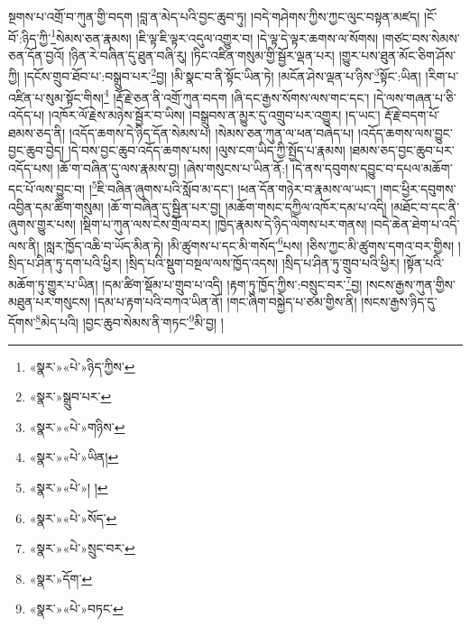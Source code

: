 སྔགས་པ་འགྲོ་བ་ཀུན་གྱི་བདག །བླ་ན་མེད་པའི་བྱང་ཆུབ་ཏུ། །བདེ་གཤེགས་ཀྱིས་ཀྱང་ལུང་བསྟན་མཛད། །ངོ་བོ་:ཉིད་ཀྱི་\footnote{«སྣར་»«པེ་»ཉིད་ཀྱིས་}སེམས་ཅན་རྣམས། །ཇི་ལྟ་ཇི་ལྟར་འདུལ་འགྱུར་བ། །དེ་ལྟ་དེ་ལྟར་ཆགས་ལ་སོགས། །གཙང་བས་སེམས་ཅན་དོན་བྱའོ། །ཉིན་རེ་བཞིན་དུ་ཐུན་བཞི་རུ། །ཏིང་འཛིན་གསུམ་གྱི་སྦྱོར་ལྡན་པར། །གྱུར་པས་ཐུན་མོང་ཅིག་ཤོས་ཀྱི། །དངོས་གྲུབ་ཐོབ་པ་:བསྒྲུབ་པར་\footnote{«སྣར་»སྒྲུབ་པར་}བྱ། །མི་སྣང་བ་ནི་སྟོང་ཡིན་ཏེ། །མངོན་ཤེས་ལྡན་པ་ཉིས་\footnote{«སྣར་»«པེ་»གཉིས་}སྟོང་:ཡིན། །རིག་པ་འཛིན་པ་སུམ་སྟོང་གིས།\footnote{«སྣར་»«པེ་»ཡིན།} །རྡོ་རྗེ་ཅན་ནི་འགྲོ་ཀུན་བདག །ཞི་དང་རྒྱས་སོགས་ལས་གང་དང་། །དེ་ལས་གཞན་པ་ཅི་འདོད་པ། །འཁོར་ལོ་རྗེས་མཉེས་སྦྱོར་བ་ཡིས། །བསྒྲུབས་ན་མྱུར་དུ་འགྲུབ་པར་འགྱུར། །ད་ཡང་། རྡོ་རྗེ་བདག་པོ་ཐམས་ཅད་ནི། །འདོད་ཆགས་དེ་ཉིད་དོན་སེམས་པ། །སེམས་ཅན་ཀུན་ལ་ཕན་བཞེད་པ། །འདོད་ཆགས་ལས་བྱུང་བྱང་ཆུབ་བྱེད། །དེ་བས་བྱང་ཆུབ་འདོད་ཆགས་པས། །ལུས་ངག་ཡིད་ཀྱི་སྤྱོད་པ་རྣམས། །ཐམས་ཅད་བྱང་ཆུབ་པར་འདོད་པས། །ཆོ་ག་བཞིན་དུ་ལས་རྣམས་བྱ། །ཞེས་གསུངས་པ་ཡིན་ནོ:། །དེ་ནས་དབུགས་དབྱུང་བ་དཔལ་མཆོག་དང་པོ་ལས་བྱུང་བ། །\footnote{«སྣར་»«པེ་»། །}ཇི་བཞིན་ཞུགས་པའི་སློབ་མ་དང་། །ཕན་དོན་གཉེར་བ་རྣམས་ལ་ཡང་། །གང་ཕྱིར་དབུགས་འབྱིན་དམ་ཚིག་གསུམ། །ཆོ་ག་བཞིན་དུ་སྦྱིན་པར་བྱ། །མཆོག་གསང་དཀྱིལ་འཁོར་དམ་པ་འདི། །མཐོང་བ་དང་ནི་ཞུགས་གྱུར་པས། །སྡིག་པ་ཀུན་ལས་ངེས་གྲོལ་བར། །ཁྱེད་རྣམས་དེ་ཉིད་ལེགས་པར་གནས། །བདེ་ཆེན་ཐེག་པ་འདི་ལས་ནི། །སླར་ཁྱོད་འཆི་བ་ཡོད་མིན་ཏེ། །མི་ཚུགས་པ་དང་མི་གསོད་\footnote{«སྣར་»«པེ་»སོད་}པས། །ཅིས་ཀྱང་མི་ཚུགས་དགའ་བར་གྱིས། །སྲིད་པ་ཤིན་ཏུ་དག་པའི་ཕྱིར། །སྲིད་པའི་སྡུག་བསྔལ་ལས་ཁྱོད་འདས། །སྲིད་པ་ཤིན་ཏུ་གྲུབ་པའི་ཕྱིར། །སྟོན་པའི་མཆོག་ཏུ་གྱུར་པ་ཡིན། །དམ་ཚིག་སྡོམ་པ་གྲུབ་པ་འདི། །རྟག་ཏུ་ཁྱོད་ཀྱིས་:བསྲུང་བར་\footnote{«སྣར་»«པེ་»སྲུང་བར་}བྱ། །སངས་རྒྱས་ཀུན་གྱིས་མཐུན་པར་གསུངས། །དམ་པ་རྟག་པའི་བཀའ་ཡིན་ནོ། །གང་ཞིག་བསྐྱེད་པ་ཙམ་གྱིས་ནི། །སངས་རྒྱས་ཉིད་དུ་དོགས་\footnote{«སྣར་»དོག་}མེད་པའི། །བྱང་ཆུབ་སེམས་ནི་གཏང་\footnote{«སྣར་»«པེ་»བཏང་}མི་བྱ། །
